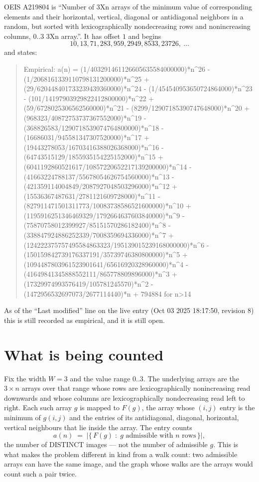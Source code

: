 \documentclass[11pt,a4paper]{article}
\theoremstyle{plain}
\theoremstyle{definition}
\begin{document}
OEIS A219804 is ``Number of 3Xn arrays of the minimum value of corresponding elements and their horizontal, vertical, diagonal or antidiagonal neighbors in a random, but sorted with lexicographically nondecreasing rows and nonincreasing columns, 0..3 3Xn array.''. It has offset $1$ and begins
\[
10, 13, 71, 283, 959, 2949, 8533, 23726,\ \dots
\]
and states:
\begin{quote}
Empirical: a(n) = (1/403291461126605635584000000)*n\^{}26 - (1/2068161339110798131200000)*n\^{}25 + (29/620448401733239439360000)*n\^{}24 - (1/454540953650724864000)*n\^{}23 - (101/14197903929822412800000)*n\^{}22 + (59/6728025306562560000)*n\^{}21 - (8299/12907185390747648000)*n\^{}20 + (968323/40872753737367552000)*n\^{}19 - (368826583/1290718539074764800000)*n\^{}18 - (16686031/945581347307520000)*n\^{}17 + (19443278053/16703416388026368000)*n\^{}16 - (64743515129/1855935154225152000)*n\^{}15 + (6041192860521617/10857220652217139200000)*n\^{}14 - (41663224788137/55678054626754560000)*n\^{}13 - (421359114004849/2087927048503296000)*n\^{}12 + (15536367487631/2781121609728000)*n\^{}11 - (827911471501311773/10083738586521600000)*n\^{}10 + (1195916251346469329/1792664637603840000)*n\^{}9 - (75870758012399927/85151570286182400)*n\^{}8 - (338847924886252339/7008359694336000)*n\^{}7 + (124222375757495584863323/195139015239168000000)*n\^{}6 - (150159842739176337191/35739746380800000)*n\^{}5 + (1094487803961523901641/65616920328960000)*n\^{}4 - (41649841345888552111/865778809896000)*n\^{}3 + (17329974993576419/105781245570)*n\^{}2 - (1472956532697073/2677114440)*n + 794884 for n>14
\end{quote}
As of the ``Last modified'' line on the live entry (Oct 03 2025 18:17:50, revision 8)
this is still recorded as empirical, and it is still open.

\section{What is being counted}

Fix the width $W=3$ and the value range $0..3$. The underlying arrays are the
$3\times n$ arrays over that range whose rows are lexicographically nonincreasing read downwards
and whose columns are lexicographically nondecreasing read left to right. Each such array $g$
is mapped to $F(g)$, the array whose $(i,j)$ entry is the minimum of $g(i,j)$ and the entries
of its antidiagonal, diagonal, horizontal, vertical neighbours that lie inside the array. The entry counts
\[
a(n)\;=\;\bigl|\{\,F(g)\;:\;g\text{ admissible with }n\text{ rows}\,\}\bigr|,
\]
the number of DISTINCT images --- not the number of admissible $g$. This is what makes the
problem different in kind from a walk count: two admissible arrays can have the same image, and
the graph whose walks are the arrays would count such a pair twice.
\end{document}
